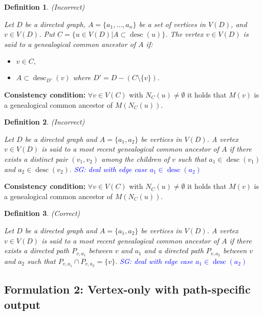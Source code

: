 \documentclass[14pt]{extarticle}
\DeclareMathOperator{\desc}{desc}
\newtheorem{definition}{Definition}
\newcommand{\sgcomment}[1]{\textcolor{blue}{SG: #1}}
\begin{document}
\begin{definition} (Incorrect)
	
	Let $D$ be a directed graph, $A = \{a_1, \ldots, a_n\}$ be a set of vertices in $V(D)$, and $v \in V(D)$. Put $C = \{u \in V(D) | A \subset \desc(u) \}$. The vertex $v \in V(D)$ is said to a genealogical common ancestor of $A$ if:
	
	\begin{itemize}
		\item 
		$v \in C,$
		\item 
		$A \subset \desc_{D'}(v)$ where $D' = D -  (C \setminus \{v\}).$
	\end{itemize}
	
\end{definition}




\textbf{Consistency condition:}  $\forall v \in V(C)$ with $N_C(u) \ne \emptyset$ it holds that $M(v)$ is a genealogical common ancestor of $M(N_C(u))$.


\begin{definition} (Incorrect)
	
	Let $D$ be a directed graph and $A = \{a_1, a_2\}$ be vertices in $V(D)$. A vertex $v \in V(D)$ is said to a most recent genealogical common ancestor of $A$ if there exists 
	a distinct pair $(v_1,v_2)$ among the children of $v$ such that $a_1 \in \desc(v_1)$ and  $a_2 \in \desc(v_2).$
	\sgcomment{deal with edge case $a_1 \in \desc(a_2)$}
\end{definition}

\textbf{Consistency condition:}  $\forall v \in V(C)$ with $N_C(u) \ne \emptyset$ it holds that $M(v)$ is a genealogical common ancestor of $M(N_C(u))$.


\begin{definition} (Correct)
	
	Let $D$ be a directed graph and $A = \{a_1, a_2\}$ be vertices in $V(D)$. A vertex $v \in V(D)$ is said to a most recent genealogical common ancestor of $A$ if there exists 
	a directed path $P_{v,a_1}$ between $v$ and $a_1$ and a directed path $P_{v,a_2}$ between $v$ and $a_2$ such that $P_{v,a_1} \cap P_{v,a_2} = \{v\}.$
	\sgcomment{deal with edge case $a_1 \in \desc(a_2)$}
\end{definition}



\subsection{Formulation 2: Vertex-only with path-specific output}
\end{document}
